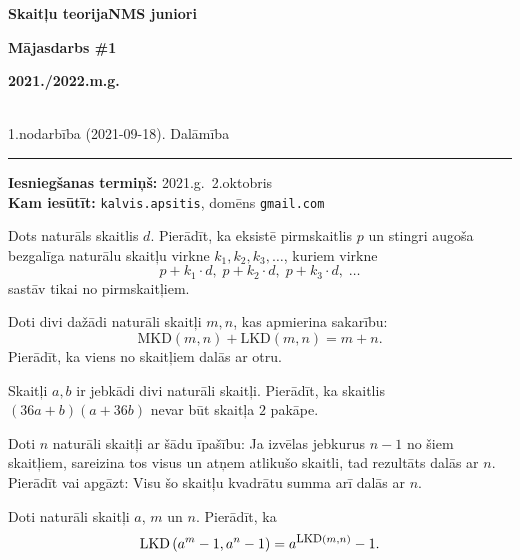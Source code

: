 \documentclass[a4paper,12pt]{article}
\begin{document}
\begin{center}
\parbox{3.5cm}{\flushleft\bf Skaitļu teorija\linebreak NMS juniori} \hfill {\bf\LARGE Mājasdarbs \#1} \hfill \parbox{3.5cm}{\flushright\bf 2021./2022.m.g.} \\[2pt]
\rm\small 1.nodarbība (2021-09-18). Dalāmība
\end{center}

\hrule

\vspace{20pt}
{\bf Iesniegšanas termiņš:} 2021.g.\ 2.oktobris\\
{\bf Kam iesūtīt:} {\tt kalvis.apsitis}, domēns {\tt gmail.com}


\vspace{20pt}
\begin{problem}
Dots naturāls skaitlis $d$. Pierādīt, ka eksistē pirmskaitlis $p$ un stingri 
augoša bezgalīga naturālu skaitļu virkne $k_1,k_2,k_3,\ldots$, kuriem
virkne
\[ p + k_1 \cdot d,\; p + k_2 \cdot d,\; p + k_3 \cdot d,\; \ldots \]
sastāv tikai no pirmskaitļiem.
\end{problem}

\vspace{20pt}
\begin{problem} 
Doti divi dažādi naturāli skaitļi $m,n$, kas apmierina sakarību: 
\[ \mbox{MKD}(m,n) + \mbox{LKD}(m,n) = m+n. \]
Pierādīt, ka viens no skaitļiem dalās ar otru.
\end{problem}

\vspace{20pt}
\begin{problem}
Skaitļi $a,b$ ir jebkādi divi naturāli skaitļi. 
Pierādīt, ka skaitlis $(36a+b)(a + 36b)$ nevar būt skaitļa $2$ pakāpe.
\end{problem}

\vspace{20pt}
\begin{problem}
Doti $n$ naturāli skaitļi ar šādu īpašību: Ja izvēlas jebkurus 
$n-1$ no šiem skaitļiem, sareizina tos visus un atņem atlikušo skaitli, tad
rezultāts dalās ar $n$. Pierādīt vai apgāzt: Visu šo skaitļu kvadrātu 
summa arī dalās ar $n$. 
\end{problem}



\vspace{20pt}
\begin{problem}
Doti naturāli skaitļi $a$, $m$ un $n$. Pierādīt, ka 
\[ \mbox{LKD}\left( a^m - 1, a^n - 1 \right) = a^{\mbox{\footnotesize LKD}(m,n)} - 1. \]
\end{problem}
\end{document}

